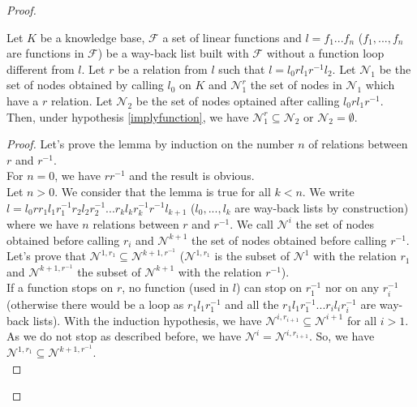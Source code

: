 \documentclass[10pt,a4paper,draft]{article}
\begin{document}
\begin{proof}
\begin{lemma}
Let $K$ be a knowledge base, $\mathcal{F}$ a set of linear functions and $l = f_1 ... f_n$ ($f_1,...,f_n$ are functions in $\mathcal{F}$) be a way-back list built with $\mathcal{F}$ without a function loop different from $l$. Let $r$ be a relation from $l$ such that $l = l_0 r l_1 r^{-1} l_2$. Let $\mathcal{N}_1$ be the set of nodes obtained by calling $l_0$ on $K$ and $\mathcal{N}_1^r$ the set of nodes in $\mathcal{N}_1$ which have a $r$ relation. Let $\mathcal{N}_2$ be the set of nodes optained after calling $l_0 r l_1 r^{-1}$. Then, under hypothesis \ref{implyfunction}, we have $\mathcal{N}_1^r \subseteq \mathcal{N}_2$ or $\mathcal{N}_2 = \emptyset$.
\end{lemma}

\begin{proof}
Let's prove the lemma by induction on the number $n$ of relations between $r$ and $r^{-1}$.\\
For $n = 0$, we have $r r^{-1}$ and the result is obvious. \\

Let $n > 0$. We consider that the lemma is true for all $k < n$. We write $l = l_0 r r_1 l_1 r_1^{-1} r_2 l_2 r_2^{-1} ... r_k l_k r_k^{-1} r^{-1} l_{k+1}$ ($l_0, ..., l_k$ are way-back lists by construction) where we have $n$ relations between $r$ and $r^{-1}$. We call $\mathcal{N}^i$ the set of nodes obtained before calling $r_i$ and $\mathcal{N}^{k+1}$ the set of nodes obtained before calling $r^{-1}$.\\

Let's prove that $\mathcal{N}^{1, r_1} \subseteq \mathcal{N}^{k+1, r^{-1}}$ ($\mathcal{N}^{1, r_1}$ is the subset of $\mathcal{N}^{1}$ with the relation $r_1$ and $\mathcal{N}^{k+1, r^{-1}}$ the subset of $\mathcal{N}^{k+1}$ with the relation $r^{-1}$).\\

If a function stops on $r$, no function (used in $l$) can stop on $r_1^{-1}$ nor on any $r_i^{-1}$ (otherwise there would be a loop as $r_1 l_1 r_1^{-1}$ and all the $r_1 l_1 r_1^{-1} ... r_i l_i r_i^{-1}$ are way-back lists). With the induction hypothesis, we have $\mathcal{N}^{i, r_{i+1}} \subseteq \mathcal{N}^{i+1}$ for all $i > 1$. As we do not stop as described before, we have $\mathcal{N}^i = \mathcal{N}^{i, r_{i+1}}$. So, we have $\mathcal{N}^{1, r_1} \subseteq \mathcal{N}^{k+1, r^{-1}}$.\\


\end{proof}
\end{proof}
\end{document}
